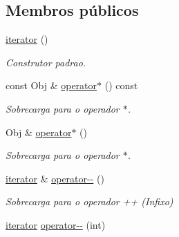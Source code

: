 \subsection*{Membros públicos}
\begin{DoxyCompactItemize}
\item 
\hyperlink{class_vector_1_1iterator_aa69868c2cdf276d8775e30fb905db3c1}{iterator} ()\hypertarget{class_vector_1_1iterator_aa69868c2cdf276d8775e30fb905db3c1}{}\label{class_vector_1_1iterator_aa69868c2cdf276d8775e30fb905db3c1}

\begin{DoxyCompactList}\small\item\em Construtor padrao. \end{DoxyCompactList}\item 
const Obj \& \hyperlink{class_vector_1_1iterator_a734abe09985e0d060a092fdd4e8fe56f}{operator$\ast$} () const \hypertarget{class_vector_1_1iterator_a734abe09985e0d060a092fdd4e8fe56f}{}\label{class_vector_1_1iterator_a734abe09985e0d060a092fdd4e8fe56f}

\begin{DoxyCompactList}\small\item\em Sobrecarga para o operador $\ast$. \end{DoxyCompactList}\item 
Obj \& \hyperlink{class_vector_1_1iterator_a489fefc64b8e2ce69631efc39713d75c}{operator$\ast$} ()\hypertarget{class_vector_1_1iterator_a489fefc64b8e2ce69631efc39713d75c}{}\label{class_vector_1_1iterator_a489fefc64b8e2ce69631efc39713d75c}

\begin{DoxyCompactList}\small\item\em Sobrecarga para o operador $\ast$. \end{DoxyCompactList}\item 
\hyperlink{class_vector_1_1iterator}{iterator} \& \hyperlink{class_vector_1_1iterator_a25f7b0fd1546c398727d588234f2abd6}{operator-\/-\/} ()\hypertarget{class_vector_1_1iterator_a25f7b0fd1546c398727d588234f2abd6}{}\label{class_vector_1_1iterator_a25f7b0fd1546c398727d588234f2abd6}

\begin{DoxyCompactList}\small\item\em Sobrecarga para o operador ++ (Infixo) \end{DoxyCompactList}\item 
\hyperlink{class_vector_1_1iterator}{iterator} \hyperlink{class_vector_1_1iterator_a1e2173dcc74c5d97ef0033b8400e2cff}{operator-\/-\/} (int)\hypertarget{class_vector_1_1iterator_a1e2173dcc74c5d97ef0033b8400e2cff}{}\label{class_vector_1_1iterator_a1e2173dcc74c5d97ef0033b8400e2cff}


\end{DoxyCompactItemize}
